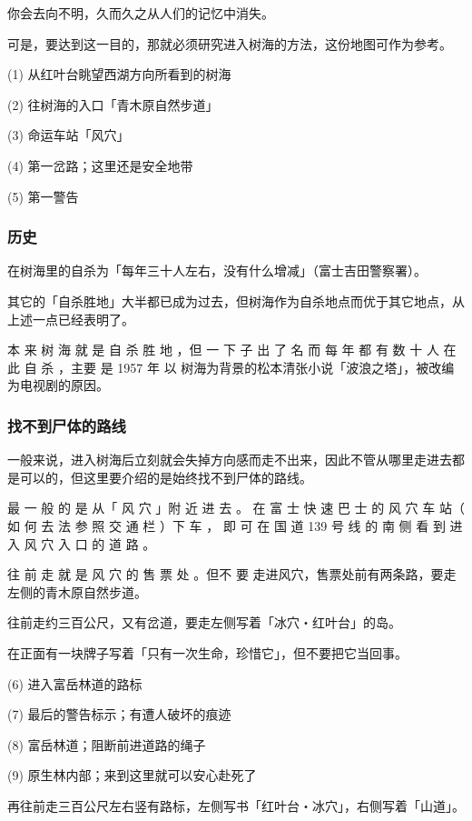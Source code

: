 \documentclass[UTF8]{ctexart}
\begin{document}
你会去向不明，久而久之从人们的记忆中消失。

可是，要达到这一目的，那就必须研究进入树海的方法，这份地图可作为参考。

(1) 从红叶台眺望西湖方向所看到的树海

(2) 往树海的入口「青木原自然步道」

(3) 命运车站「风穴」

(4) 第一岔路；这里还是安全地带

(5) 第一警告

\subsubsection{历史}

在树海里的自杀为「每年三十人左右，没有什么增减」（富士吉田警察署）。

其它的「自杀胜地」大半都已成为过去，但树海作为自杀地点而优于其它地点，从上述一点已经表明了。

本 来 树 海 就 是 自 杀 胜 地 ，但 一 下 子 出 了 名 而 每 年 都 有 数 十 人 在 此 自 杀 ，主要 是 1957 年 以 树海为背景的松本清张小说「波浪之塔」，被改编为电视剧的原因。

\subsubsection*{找不到尸体的路线}

一般来说，进入树海后立刻就会失掉方向感而走不出来，因此不管从哪里走进去都是可以的，但这里要介绍的是始终找不到尸体的路线。

最 一 般 的 是 从「 风 穴 」附 近 进 去 。
在 富 士 快 速 巴 士 的 风 穴 车 站（ 如 何 去 法 参 照 交 通 栏 ）下 车 ， 即 可 在 国 道 139 号 线 的 南 侧 看 到 进 入 风 穴 入 口 的 道 路 。

往 前 走 就 是 风 穴 的 售 票 处 。但不 要 走进风穴，售票处前有两条路，要走左侧的青木原自然步道。 

往前走约三百公尺，又有岔道，要走左侧写着「冰穴‧红叶台」的岛。

在正面有一块牌子写着「只有一次生命，珍惜它」，但不要把它当回事。

(6) 进入富岳林道的路标

(7) 最后的警告标示；有遭人破坏的痕迹

(8) 富岳林道；阻断前进道路的绳子

(9) 原生林内部；来到这里就可以安心赴死了

再往前走三百公尺左右竖有路标，左侧写书「红叶台‧冰穴」，右侧写着「山道」。
\end{document}
